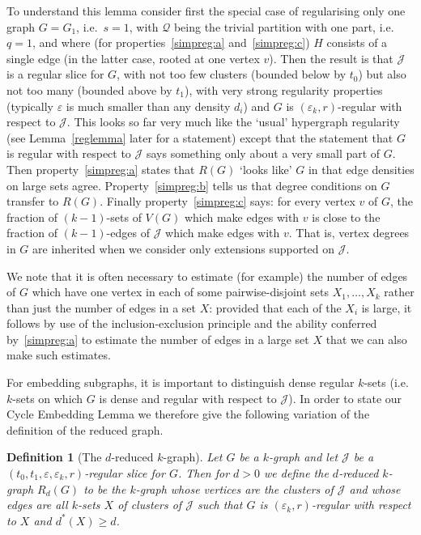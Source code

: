 \documentclass[12pt,a4paper]{amsart}
\let\eps\varepsilon
\newtheorem{definition}[theorem] {Definition}
\newcommand{\cJ}{\mathcal{J}}
\newcommand{\Qart}{\mathcal{Q}}
\newcommand{\reld}{d^*}
\begin{document}
To understand this lemma consider first the special case
of regularising only one graph $G=G_1$, i.e.~$s=1$, with $\Qart$ being the trivial partition with one
part, i.e.~$q=1$, and where (for properties~\ref{simpreg:a}
and~\ref{simpreg:c}) $H$ consists of a single edge (in the latter case, rooted at one vertex $v$). Then the result
is that $\cJ$ is a regular slice for $G$, with not too few clusters (bounded below by
$t_0$) but also not too many (bounded above by $t_1$), with very
strong regularity properties (typically $\eps$ is much smaller than any density
$d_i$) and $G$ is $(\eps_k,r)$-regular with respect to $\cJ$. This looks so far
very much like the `usual' hypergraph regularity (see Lemma~\ref{reglemma} later
for a statement) except that the statement that $G$ is regular with respect to
$\cJ$ says something only about a very small part of $G$. Then
property~\ref{simpreg:a} states that $R(G)$ `looks like' $G$ in that
edge densities on large sets agree. Property~\ref{simpreg:b} tells us that degree conditions on $G$ transfer to $R(G)$. Finally
property~\ref{simpreg:c} says: for every vertex $v$ of $G$, the fraction
of $(k-1)$-sets of $V(G)$ which make edges with $v$ is close to the fraction
of $(k-1)$-edges of $\cJ$ which make edges with $v$. That is, vertex degrees in $G$ are inherited when we consider only extensions supported on $\cJ$.

We note that it is often necessary to estimate (for example) the number of edges
of $G$ which have one vertex in each of some pairwise-disjoint sets $X_1,\ldots,X_k$ rather than
just the number of edges in a set $X$: provided that each of the $X_i$ is large,
it follows by use of the inclusion-exclusion principle and the ability conferred
by~\ref{simpreg:a} to estimate the number of edges in a large set $X$ that we
can also make such estimates.

For embedding subgraphs, it is important to distinguish dense regular $k$-sets (i.e. $k$-sets on which $G$ is dense and regular with respect to $\cJ$). In order to state our Cycle Embedding Lemma we therefore give the following variation of the definition of the reduced graph.

\begin{definition}[The $d$-reduced $k$-graph] \label{def:redgraph}
Let $G$ be a $k$-graph and let $\cJ$ be a
$(t_0,t_1,\eps,\eps_k,r)$-regular slice for $G$. Then for $d>0$ we
define the $d$-reduced $k$-graph $R_d(G)$ to be the $k$-graph whose vertices
are the clusters of $\cJ$ and whose edges are all $k$-sets $X$ of clusters of
$\cJ$ such that $G$ is $(\eps_k, r)$-regular with respect to $X$ and $\reld(X) \geq d$.
\end{definition}
\end{document}
